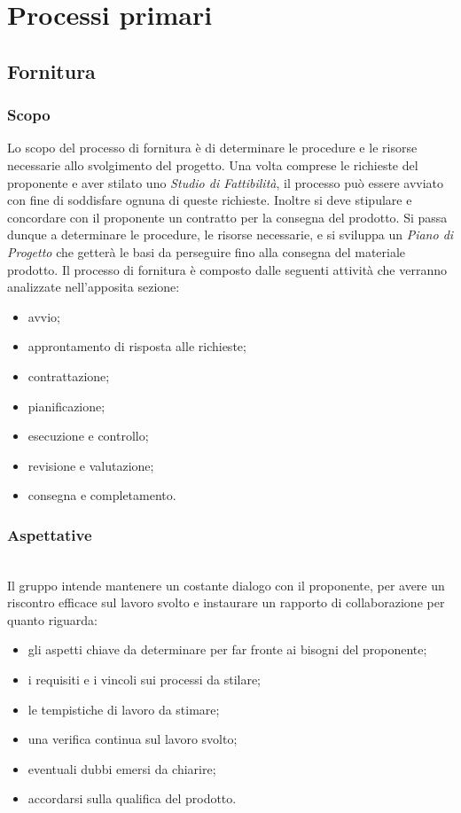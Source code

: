 \section{Processi primari}

\subsection{Fornitura}
	\subsubsection{Scopo}
	Lo scopo del processo di fornitura è di determinare le procedure e le risorse 
	necessarie allo svolgimento del progetto. Una volta comprese le richieste del 
	proponente e aver stilato uno \textit{Studio di Fattibilità}, il processo può 
	essere avviato con fine di soddisfare ognuna di queste richieste. Inoltre si 
	deve stipulare e concordare con il proponente un contratto per la consegna del 
	prodotto. Si passa dunque a determinare le procedure, le risorse necessarie, e 
	si sviluppa un \textit{Piano di Progetto} che getterà le basi da perseguire fino 
	alla consegna del materiale prodotto.
	Il processo di fornitura è composto dalle seguenti attività che verranno 
	analizzate nell'apposita sezione:
		\begin{itemize}
			\item avvio;
			\item approntamento di risposta alle richieste;
			\item contrattazione;
			\item pianificazione;
			\item esecuzione e controllo;
			\item revisione e valutazione;
			\item consegna e completamento.
		\end{itemize}
	
	\subsubsection{Aspettative} \mbox{}\\ 
	\noindent Il gruppo intende mantenere un costante dialogo con il proponente, per avere un 
	riscontro efficace sul lavoro svolto e instaurare un rapporto di collaborazione 
	per quanto riguarda:
		\begin{itemize}
			\item gli aspetti chiave da determinare per far fronte ai bisogni del proponente;
			\item i requisiti e i vincoli sui processi da stilare;
			\item le tempistiche di lavoro da stimare;
			\item una verifica continua sul lavoro svolto;
			\item eventuali dubbi emersi da chiarire;
			\item accordarsi sulla qualifica del prodotto.
		\end{itemize}
	

